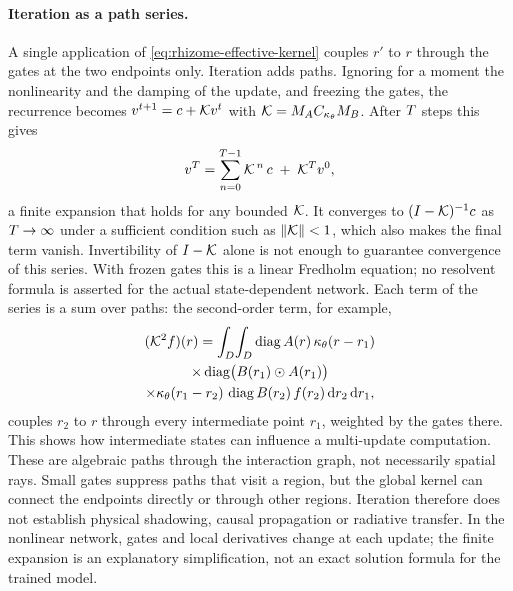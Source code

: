 \paragraph{Iteration as a path series.} A single application of \cref{eq:rhizome-effective-kernel} couples $r'$ to $r$ through the gates at the two endpoints only. Iteration adds paths. Ignoring for a moment the nonlinearity and the damping of the update, and freezing the gates, the recurrence becomes $v^{t+1}=c+\mathcal{K} v^t$ with $\mathcal{K}=M_A C_{\kappa_\theta} M_B$. After $T$ steps this gives
\begin{equation}
  \label{eq:neumann}
  v^{T} = \sum_{n=0}^{T-1}\mathcal{K}^{\,n}\,c \;+\; \mathcal{K}^{T} v^0,
\end{equation}
a finite expansion that holds for any bounded $\mathcal{K}$. It converges to $(I-\mathcal{K})^{-1}c$ as $T\to\infty$ under a sufficient condition such as $\lVert\mathcal{K}\rVert<1$, which also makes the final term vanish. Invertibility of $I-\mathcal{K}$ alone is not enough to guarantee convergence of this series. With frozen gates this is a linear Fredholm equation; no resolvent formula is asserted for the actual state-dependent network. Each term of the series is a sum over paths: the second-order term, for example,
\begin{multline}
  \label{eq:two-hop}
  (\mathcal{K}^2 f)(r) = \int_D\!\int_D \operatorname{diag} A(r)\,\kappa_\theta(r-r_1)\\
  \times\operatorname{diag}\!\big(B(r_1)\odot A(r_1)\big)\\
  \times\kappa_\theta(r_1-r_2)\,\operatorname{diag} B(r_2)\,f(r_2)\,\mathrm{d} r_2\,\mathrm{d} r_1,
\end{multline}
couples $r_2$ to $r$ through every intermediate point $r_1$, weighted by the gates there. This shows how intermediate states can influence a multi-update computation. These are algebraic paths through the interaction graph, not necessarily spatial rays. Small gates suppress paths that visit a region, but the global kernel can connect the endpoints directly or through other regions. Iteration therefore does not establish physical shadowing, causal propagation or radiative transfer. In the nonlinear network, gates and local derivatives change at each update; the finite expansion is an explanatory simplification, not an exact solution formula for the trained model.

